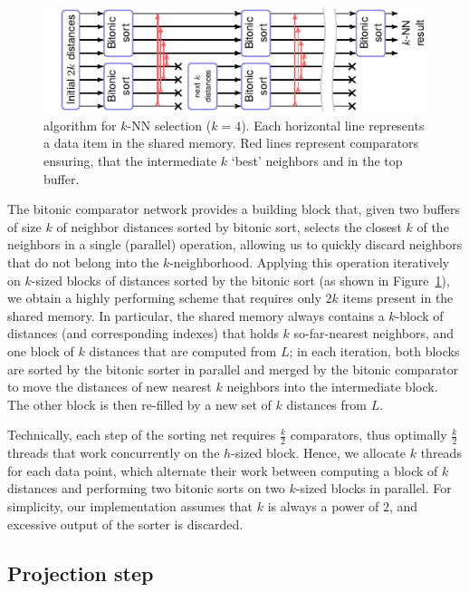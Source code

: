 \begin{figure}
	\centering
	\includegraphics{embedsom/pic/bitonic.pdf}
	\caption{ algorithm for $k$-NN selection ($k=4$). Each horizontal line represents a data item in the shared memory. Red lines represent comparators ensuring, that the intermediate $k$ `best' neighbors and in the top buffer.}
	\label{fig:bitonic-schema}
\end{figure}

The bitonic comparator network provides a building block that, given two buffers of size $k$ of neighbor distances sorted by bitonic sort, selects the closest $k$ of the neighbors in a single (parallel) operation, allowing us to quickly discard neighbors that do not belong into the $k$-neighborhood.
Applying this operation iteratively on $k$-sized blocks of distances sorted by the bitonic sort (as shown in Figure~\ref{fig:bitonic-schema}), we obtain a highly performing scheme that requires only $2k$ items present in the shared memory.
In particular, the shared memory always contains a $k$-block of distances (and corresponding indexes) that holds $k$ so-far-nearest neighbors, and one block of $k$ distances that are computed from $L$; in each iteration, both blocks are sorted by the bitonic sorter in parallel and merged by the bitonic comparator to move the distances of new nearest $k$ neighbors into the intermediate block.
The other block is then re-filled by a new set of $k$ distances from $L$.

Technically, each step of the sorting net requires $\frac{k}{2}$ comparators, thus optimally $\frac{k}{2}$ threads that work concurrently on the $h$-sized block.
Hence, we allocate $k$ threads for each data point, which alternate their work between computing a block of $k$ distances and performing two bitonic sorts on two $k$-sized blocks in parallel.
For simplicity, our implementation assumes that $k$ is always a power of $2$, and excessive output of the sorter is discarded.



\subsection{Projection step}\label{sec:impl-projection}


